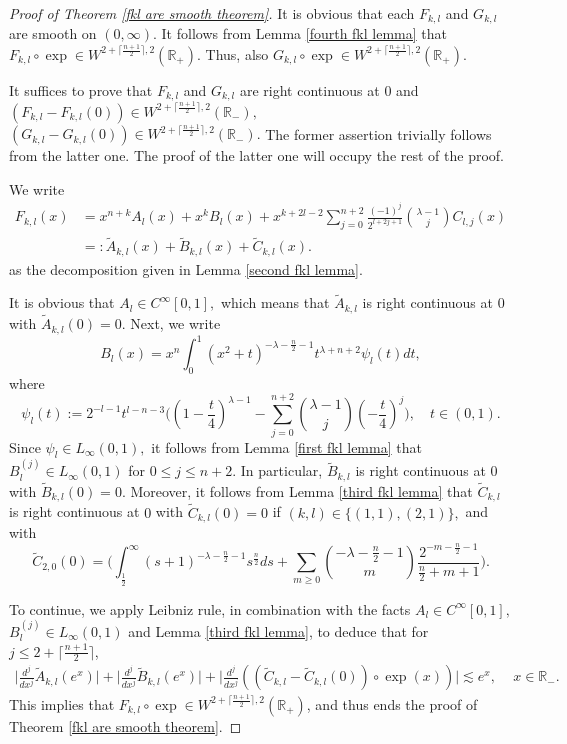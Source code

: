 \documentclass[12pt]{amsart}
\begin{document}
\begin{proof}[Proof of Theorem \ref{fkl are smooth theorem}]
It is obvious that each $F_{k,l}$ and $G_{k,l}$ are smooth on $(0,\infty).$ It follows from Lemma \ref{fourth fkl lemma} that $F_{k,l}\circ\exp\in W^{2+\lceil\frac{n+1}{2}\rceil,2}(\mathbb{R}_+).$ Thus, also $G_{k,l}\circ\exp\in W^{2+\lceil\frac{n+1}{2}\rceil,2}(\mathbb{R}_+).$

It suffices to prove that $F_{k,l}$ and $G_{k,l}$ are right continuous at $0$ and $(F_{k,l}-F_{k,l}(0))\in W^{2+\lceil\frac{n+1}{2}\rceil,2}(\mathbb{R}_-),$ $(G_{k,l}-G_{k,l}(0))\in W^{2+\lceil\frac{n+1}{2}\rceil,2}(\mathbb{R}_-).$ The former assertion trivially follows from the latter one. The proof of the latter one will occupy the rest of the proof.

We write
\begin{align*}
F_{k,l}(x)&=x^{n+k}A_l(x)+x^kB_l(x)+x^{k+2l-2}\sum_{j=0}^{n+2}\frac{(-1)^j}{2^{l+2j+1}}\binom{\lambda-1}{j}C_{l,j}(x)
\\&=:\tilde{A}_{k,l}(x)+\tilde{B}_{k,l}(x)+\tilde{C}_{k,l}(x).
\end{align*}
as the decomposition given in Lemma \ref{second fkl lemma}.

It is obvious that $A_l\in C^{\infty}[0,1],$ which means that $\tilde{A}_{k,l}$ is right continuous at $0$ with $\tilde{A}_{k,l}(0)=0$. Next, we write
$$B_l(x)=x^n\int_0^1(x^2+t)^{-\lambda-\frac{n}{2}-1}t^{\lambda+n+2}\psi_l(t)dt,$$
where
$$\psi_l(t):=2^{-l-1}t^{l-n-3}\Big((1-\frac{t}{4})^{\lambda-1}-\sum_{j=0}^{n+2}\binom{\lambda-1}{j}(-\frac{t}{4})^j\Big),\quad t\in(0,1).$$
Since $\psi_l\in L_{\infty}(0,1),$ it follows from Lemma \ref{first fkl lemma} that $B_l^{(j)}\in L_{\infty}(0,1)$ for $0\leq j\leq n+2.$ In particular, $\tilde{B}_{k,l}$ is right continuous at $0$ with $\tilde{B}_{k,l}(0)=0$. Moreover, it follows from Lemma \ref{third fkl lemma} that $\tilde{C}_{k,l}$ is right continuous at $0$ with $\tilde{C}_{k,l}(0)=0$ if $(k,l)\in\{(1,1),(2,1)\},$ and with $$\tilde{C}_{2,0}(0)=\Big( \int_{\frac12}^{\infty}(s+1)^{-\lambda-\frac{n}{2}-1}s^{\frac{n}{2}}ds+\sum_{m\geq0}\binom{-\lambda-\frac{n}{2}-1}{m}\frac{2^{-m-\frac{n}{2}-1}}{\frac{n}{2}+m+1}\Big).$$

To continue, we apply Leibniz rule, in combination with the facts $A_l\in C^{\infty}[0,1],$ $B_l^{(j)}\in L_{\infty}(0,1)$ and Lemma \ref{third fkl lemma}, to deduce that for $j\leq 2+\lceil\frac{n+1}{2}\rceil$,
\begin{align*}
\Big|\frac{d^j}{dx^j}\tilde{A}_{k,l}(e^x)\Big|+\Big|\frac{d^j}{dx^j}\tilde{B}_{k,l}(e^x)\Big|+\Big|\frac{d^j}{dx^j}((\tilde{C}_{k,l}-\tilde{C}_{k,l}(0))\circ \exp (x))\Big|\lesssim e^{x},\,\quad
  x\in \mathbb{R}_{-}.
\end{align*}
This implies that $F_{k,l}\circ\exp\in W^{2+\lceil\frac{n+1}{2}\rceil,2}(\mathbb{R}_+)$, and thus ends the proof of Theorem \ref{fkl are smooth theorem}.
\end{proof}
\end{document}
